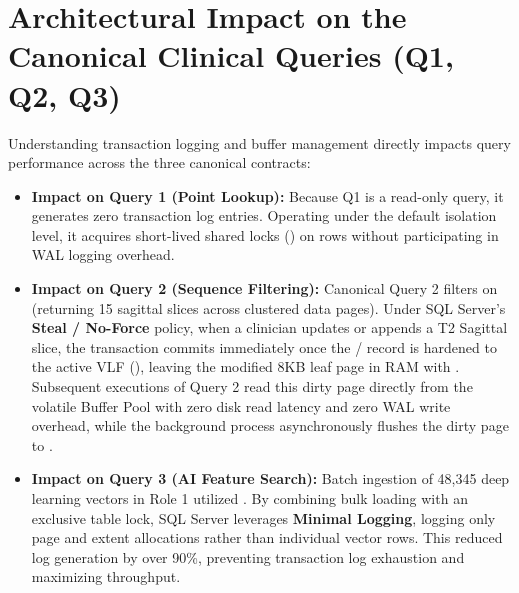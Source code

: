 \section{Architectural Impact on the Canonical Clinical Queries (Q1, Q2, Q3)}
Understanding transaction logging and buffer management directly impacts query performance across the three canonical contracts:
\begin{itemize}
    \item \textbf{Impact on Query 1 (Point Lookup):} Because Q1 is a read-only query, it generates zero transaction log entries. Operating under the default  isolation level, it acquires short-lived shared locks () on rows without participating in WAL logging overhead.
\item \textbf{Impact on Query 2 (Sequence Filtering):} Canonical Query 2 filters  on  (returning 15 sagittal slices across clustered data pages). Under SQL Server's \textbf{Steal / No-Force} policy, when a clinician updates or appends a T2 Sagittal slice, the transaction commits immediately once the  /  record is hardened to the active VLF (), leaving the modified 8KB leaf page in RAM with . Subsequent executions of Query 2 read this dirty page directly from the volatile Buffer Pool with zero disk read latency and zero WAL write overhead, while the background  process asynchronously flushes the dirty page to .
    \item \textbf{Impact on Query 3 (AI Feature Search):} Batch ingestion of 48,345 deep learning vectors in Role 1 utilized . By combining bulk loading with an exclusive table lock, SQL Server leverages \textbf{Minimal Logging}, logging only page and extent allocations rather than individual vector rows. This reduced log generation by over 90\%, preventing transaction log exhaustion and maximizing throughput.
\end{itemize}
